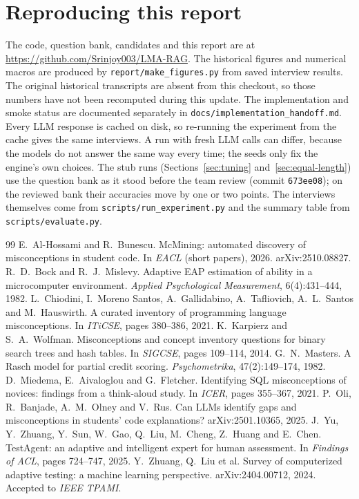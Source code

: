 \documentclass[11pt,a4paper]{article}
\begin{document}
\section*{Reproducing this report}
The code, question bank, candidates and this report are at
\url{https://github.com/Srinjoy003/LMA-RAG}.
The historical figures and numerical macros are produced by \texttt{report/make\_figures.py} from
saved interview results. The original historical transcripts are absent from this checkout,
so those numbers have not been recomputed during this update. The implementation and smoke
status are documented separately in \texttt{docs/implementation\_handoff.md}. Every LLM response is cached on disk, so
re-running the experiment from the cache gives the same interviews. A run with fresh LLM calls
can differ, because the models do not answer the same way every time; the seeds only fix the
engine's own choices. The stub runs (Sections~\ref{sec:tuning} and~\ref{sec:equal-length})
use the question bank as it stood before the team review (commit \texttt{673ee08}); on the reviewed
bank their accuracies move by one or two points. The interviews themselves come from
\texttt{scripts/run\_experiment.py} and the summary table from \texttt{scripts/evaluate.py}.

\begin{thebibliography}{99}\small
{} E.~Al-Hossami and R.~Bunescu. McMining: automated discovery of
  misconceptions in student code. In \emph{EACL} (short papers), 2026. arXiv:2510.08827.
 R.~D.~Bock and R.~J.~Mislevy. Adaptive EAP estimation of ability in a
  microcomputer environment. \emph{Applied Psychological Measurement}, 6(4):431--444, 1982.
 L.~Chiodini, I.~Moreno Santos, A.~Gallidabino, A.~Tafliovich, A.~L.~Santos
  and M.~Hauswirth. A curated inventory of programming language misconceptions. In \emph{ITiCSE},
  pages 380--386, 2021.
 K.~Karpierz and S.~A.~Wolfman. Misconceptions and concept inventory
  questions for binary search trees and hash tables. In \emph{SIGCSE}, pages 109--114, 2014.
 G.~N.~Masters. A Rasch model for partial credit scoring.
  \emph{Psychometrika}, 47(2):149--174, 1982.
 D.~Miedema, E.~Aivaloglou and G.~Fletcher. Identifying SQL misconceptions of
  novices: findings from a think-aloud study. In \emph{ICER}, pages 355--367, 2021.
 P.~Oli, R.~Banjade, A.~M.~Olney and V.~Rus. Can LLMs identify gaps and
  misconceptions in students' code explanations? arXiv:2501.10365, 2025.
 J.~Yu, Y.~Zhuang, Y.~Sun, W.~Gao, Q.~Liu, M.~Cheng, Z.~Huang and E.~Chen.
  TestAgent: an adaptive and intelligent expert for human assessment. In \emph{Findings of ACL},
  pages 724--747, 2025.
 Y.~Zhuang, Q.~Liu et al. Survey of computerized adaptive testing: a machine
  learning perspective. arXiv:2404.00712, 2024. Accepted to \emph{IEEE TPAMI}.
\end{thebibliography}
\end{document}
